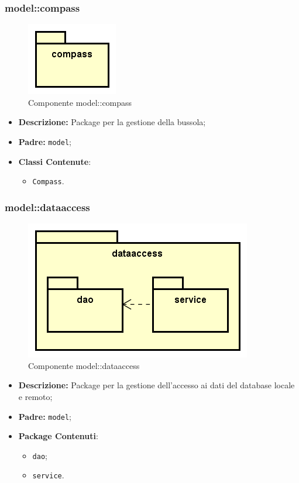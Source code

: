 \documentclass[../DefinizioneDiProdotto.tex]{subfiles}
\begin{document}
\subsubsection{model::\-compass}

\begin{figure}[H]
	\centering
	\includegraphics[width=\maxwidth]{img/package/compass.png}
	\caption{Componente model::\-compass}\label{fig:model::compass} 
\end{figure}
\begin{itemize}
	\item \textbf{Descrizione:} Package per la gestione della bussola;
	\item \textbf{Padre:} \texttt{model};
	\item \textbf{Classi Contenute}:
	\begin{itemize}
		\item \texttt{Compass}.
		
	\end{itemize}
\end{itemize}

\subsubsection{model::\-dataaccess}

\begin{figure}[H]
	\centering
	\includegraphics[width=\maxwidth]{img/package/dataaccess.png}
	\caption{Componente model::\-dataaccess}\label{fig:model::dataaccess} 
\end{figure}
\begin{itemize}
	\item \textbf{Descrizione:} Package per la gestione dell'accesso ai dati del database locale e remoto;
	\item \textbf{Padre:} \texttt{model};
	\item \textbf{Package Contenuti}:
	\begin{itemize}
		\item \texttt{dao};
		
		\item \texttt{service}.
		
	\end{itemize}
\end{itemize}
\end{document}
